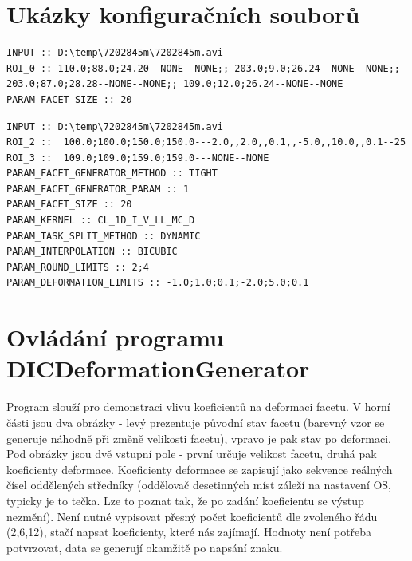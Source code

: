 \documentclass[a4paper,12pt]{article}
\begin{document}
\section{Ukázky konfiguračních souborů}
\begin{lstlisting}[title=Jednoduchý konfigurační soubor pro automatický výpočet]
INPUT :: D:\temp\7202845m\7202845m.avi
ROI_0 :: 110.0;88.0;24.20--NONE--NONE;; 203.0;9.0;26.24--NONE--NONE;; 203.0;87.0;28.28--NONE--NONE;; 109.0;12.0;26.24--NONE--NONE
PARAM_FACET_SIZE :: 20
\end{lstlisting}
\begin{lstlisting}[title=Plný konfigurační soubor pro automatický výpočet]
INPUT :: D:\temp\7202845m\7202845m.avi
ROI_2 ::  100.0;100.0;150.0;150.0---2.0,,2.0,,0.1,,-5.0,,10.0,,0.1--25
ROI_3 ::  109.0;109.0;159.0;159.0---NONE--NONE
PARAM_FACET_GENERATOR_METHOD :: TIGHT
PARAM_FACET_GENERATOR_PARAM :: 1
PARAM_FACET_SIZE :: 20
PARAM_KERNEL :: CL_1D_I_V_LL_MC_D
PARAM_TASK_SPLIT_METHOD :: DYNAMIC
PARAM_INTERPOLATION :: BICUBIC
PARAM_ROUND_LIMITS :: 2;4
PARAM_DEFORMATION_LIMITS :: -1.0;1.0;0.1;-2.0;5.0;0.1
\end{lstlisting}
\newpage
\section{Ovládání programu DIC\textunderscore DeformationGenerator}
\label{sec:generator}
\begin{figure}[H]
\end{figure}
Program slouží pro demonstraci vlivu koeficientů na deformaci facetu. V horní části jsou dva obrázky - levý prezentuje původní stav facetu (barevný vzor se generuje náhodně při změně velikosti facetu), vpravo je pak stav po deformaci. Pod obrázky jsou dvě vstupní pole - první určuje velikost facetu, druhá pak koeficienty deformace. Koeficienty deformace se zapisují jako sekvence reálných čísel oddělených středníky (oddělovač desetinných míst záleží na nastavení OS, typicky je to tečka. Lze to poznat tak, že po zadání koeficientu se výstup nezmění). Není nutné vypisovat přesný počet koeficientů dle zvoleného řádu (2,6,12), stačí napsat koeficienty, které nás zajímají. Hodnoty není potřeba potvrzovat, data se generují okamžitě po napsání znaku.
\end{document}
